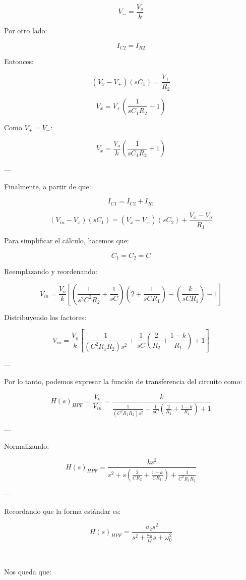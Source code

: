 \documentclass[12pt,a4paper]{article}
\begin{document}
\[
V_- = \frac{V_o}{k}
\]

Por otro lado:

\[
I_{C2} = I_{R2}
\]

Entonces:

\[
(V_x - V_+)(sC_1) = \frac{V_+}{R_2}
\]

\[
V_x = V_+ \left( \frac{1}{sC_1 R_2} + 1 \right)
\]

Como \( V_+ = V_- \):

\[
V_x = \frac{V_o}{k} \left( \frac{1}{sC_1 R_2} + 1 \right)
\]

---

Finalmente, a partir de que:

\[
I_{C1} = I_{C2} + I_{R1}
\]

\[
(V_{in} - V_x)(sC_1) = (V_x - V_+)(sC_2) + \frac{V_x - V_o}{R_1}
\]

Para simplificar el cálculo, hacemos que:

\[
C_1 = C_2 = C
\]

Reemplazando y reordenando:

\[
V_{in} = \frac{V_o}{k}
\left[
\left( \frac{1}{s^2 C^2 R_2} + \frac{1}{sC} \right)\left(2 + \frac{1}{sCR_1}\right)
- \left(\frac{k}{sCR_1}\right) - 1 
\right]
\]

Distribuyendo los factores:

\[
V_{in} = \frac{V_o}{k}
\left[
\frac{1}{(C^2 R_1 R_2)s^2}
+
\frac{1}{sC}\left(\frac{2}{R_2} + \frac{1-k}{R_1}\right)
+ 1
\right]
\]

---

Por lo tanto, podemos expresar la función de transferencia del circuito como:

\[
H(s)_{HPF} = \frac{V_o}{V_{in}} =
\frac{k}{\frac{1}{(C^2 R_1 R_2)s^2} +
\frac{1}{sC}\left(\frac{2}{R_2} + \frac{1-k}{R_1}\right) + 1}
\]

---

Normalizando:

\[
H(s)_{HPF} =
\frac{k s^2}{s^2 + s\left(\frac{2}{C R_2} + \frac{1-k}{C R_1}\right) + \frac{1}{C^2 R_1 R_2}}
\]

---

Recordando que la forma estándar es:

\[
H(s)_{HPF} = \frac{a_2 s^2}{s^2 + \frac{\omega_0}{Q}s + \omega_0^2}
\]

---

Nos queda que:

\begin{center}
\end{center}
\end{document}
